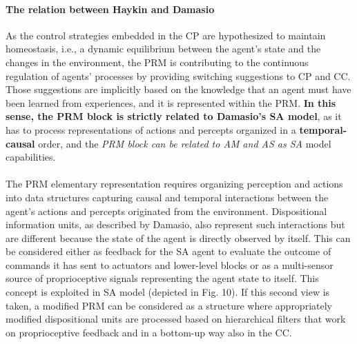 \documentclass{article}
\begin{document}
		\paragraph{The relation between Haykin and Damasio}As the control strategies embedded in the CP are hypothesized to maintain homeostasis, i.e., a dynamic equilibrium between the agent’s state and the changes in the environment, the PRM is contributing to the continuous regulation of agents’ processes by providing switching suggestions to CP and CC. Those suggestions are implicitly based on the knowledge that an agent must have been learned from experiences, and it is represented within
		the PRM. \textbf{In this sense, the PRM block is strictly related to Damasio’s SA model}, as it has to process representations of actions and percepts organized in a \textbf{temporal-causal} order, and
		the \emph{PRM block can be related to AM and AS as SA} model capabilities.
		\paragraph{} The PRM elementary representation requires organizing perception and actions into data structures capturing causal and temporal interactions between the agent’s actions and
		percepts originated from the environment. Dispositional information units, as described by Damasio, also represent such interactions but are different because the state of the agent
		is directly observed by itself. This can be considered either as feedback for the SA agent to evaluate the outcome of commands it has sent to actuators and lower-level blocks or as a multi-sensor source of proprioceptive signals representing the agent state to itself. This concept is exploited in \cite{regazzoni-2020-multi-sensorial-generative-and-descriptive-self-awareness-models-for-autonomous-systems} SA model (depicted in Fig. 10). If this second view is taken, a modified PRM can be considered as a structure where appropriately modified dispositional units are processed based
		on hierarchical filters that work on proprioceptive feedback and in a bottom-up way also in the CC.
\end{document}
